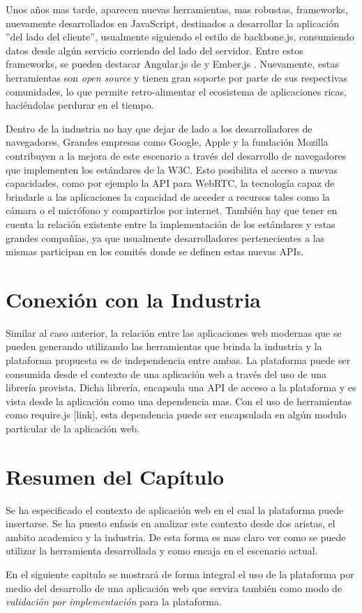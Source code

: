 Unos años mas tarde, aparecen nuevas herramientas, mas robustas, frameworks, nuevamente desarrollados en JavaScript, destinados a desarrollar la aplicación ''del lado del cliente'', usualmente siguiendo el estilo de backbone.js, consumiendo datos desde algún servicio corriendo del lado del servidor. Entre estos frameworks, se pueden destacar Angular.js de \citep{ind:angular} y Ember.js \citep{ind:ember}. Nuevamente, estas herramientas son \emph{open source} y tienen gran soporte por parte de sus respectivas comunidades, lo que permite retro-alimentar el ecosistema de aplicaciones ricas, haciéndolas perdurar en el tiempo.

Dentro de la industria no hay que dejar de lado a los desarrolladores de navegadores. Grandes empresas como Google, Apple y la fundación Mozilla contribuyen a la mejora de este escenario a través del desarrollo de navegadores que implementen los estándares de la W3C. Esto posibilita el acceso a nuevas capacidades, como por ejemplo la API para WebRTC, la tecnología capaz de brindarle a las aplicaciones la capacidad de acceder a recursos tales como la cámara o el micrófono y compartirlos por internet. También hay que tener en cuenta la relación existente entre la implementación de los estándares y estas grandes compañías, ya que usualmente desarrolladores pertenecientes a las mismas participan en los comités donde se definen estas nuevas APIs. 

\section{Conexión con la Industria} \label{sec:extension_industria_conexion}

Similar al caso anterior, la relación entre las aplicaciones web modernas que se pueden generando utilizando las herramientas que brinda la industria y la plataforma propuesta es de independencia entre ambas. 
La plataforma puede ser consumida desde el contexto de una aplicación web a través del uso de una librería provista. Dicha librería, encapsula una API de acceso a la plataforma y es vista desde la aplicación como una dependencia mas. Con el uso de herramientas como require.js [link], esta dependencia puede ser encapsulada en algún modulo particular de la aplicación web. 

\section{Resumen del Capítulo} \label{sec:extension_conclusion}
Se ha especificado el contexto de aplicación web en el cual la plataforma puede insertarse. Se ha puesto enfasis en analizar este contexto desde dos aristas, el ambito academico y la industria. De esta forma es mas claro ver como se puede utilizar la herramienta desarrollada y como encaja en el escenario actual.

En el siguiente capitulo se mostrará de forma integral el uso de la plataforma por medio del desarrollo de una aplicación web que servira también como modo de \emph{validación por implementación} para la plataforma.